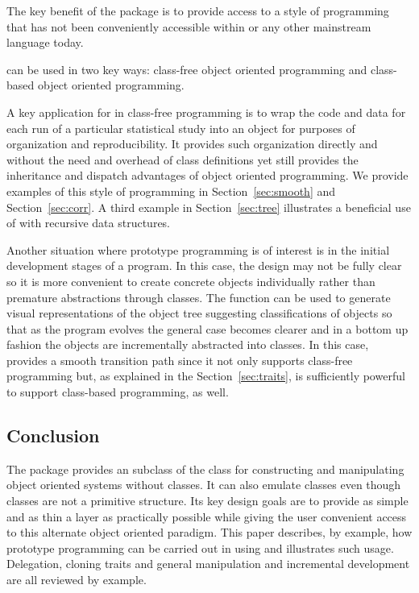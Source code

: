 \documentclass{Z}
\begin{document}
The key benefit of the  package is to provide 
access to a style of programming that has not been conveniently
accessible within  or any other mainstream language today.

 can be used in two key ways: class-free object oriented programming
and class-based object oriented programming.  

A key application for  in class-free programming is to wrap the code
and data for each run of a particular statistical study into an object for
purposes of organization and reproducibility.  It provides such organization
directly and without the need and overhead of class definitions
yet still provides the
inheritance and dispatch advantages of object oriented programming.  
We provide examples of this style of programming in 
Section~\ref{sec:smooth}
and
Section~\ref{sec:corr}.
A third example in 
Section~\ref{sec:tree} illustrates a beneficial use of  with 
recursive data structures.  

Another situation where prototype programming is of interest is in the initial
development stages of a program.  In this case, the design may not be fully
clear so it is more convenient to create concrete objects individually rather
than premature abstractions through classes.  The 
function can be used to generate visual representations of the object
tree suggesting classifications of objects so that 
as the program evolves the general case becomes clearer and
in a bottom up fashion the objects are incrementally abstracted into 
classes.  In this case,
 provides a smooth transition path since it not only supports
class-free programming but, as explained in the Section~\ref{sec:traits}, is
sufficiently powerful to support class-based programming, as well.   


\subsection{Conclusion}

The package  provides an  subclass of the
 class for constructing and manipulating object
oriented systems without classes.  It can also emulate classes even
though classes are not a primitive structure.  Its key design goals
are to provide as simple and as thin a layer as practically possible
while giving the user convenient access to this alternate object
oriented paradigm.  This paper describes, by example, how prototype
programming can be carried out in  using  and
illustrates such usage.  Delegation, cloning traits and general
manipulation and incremental development are all reviewed by example.
\end{document}

